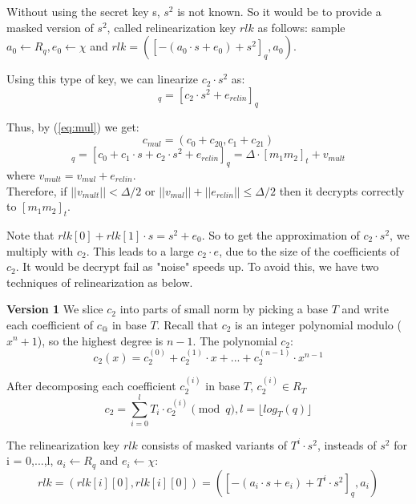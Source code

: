 \documentclass[A4paper,12pt]{article}
\begin{document}
Without using the secret key s, $s^2$ is not known. So it would be to provide a masked version of $s^2$, called relinearization key $rlk$ as follows: sample $a_0 \leftarrow R_q, e_0 \leftarrow \chi$ and $rlk = ([ -(a_0 \cdot s + e_0) + s^2]_q, a_0)$. \newline

Using this type of key, we can linearize $c_2 \cdot s^2$ as:
\begin{equation*}
	[c_{20} + c_{21} \cdot s]_q = [c_2 \cdot s^2 + e_{relin}]_q
\end{equation*}

Thus, by (\ref{eq:mul}) we get:
\begin{equation*}
	c_{mul} = (c_0 + c_{20}, c_1 + c_{21})
\end{equation*}
\begin{equation*}
	[c_0 + c_{20} + (c_1 + c_{21}) \cdot s]_q = [c_0 + c_1 \cdot s + c_2 \cdot s^2 + e_{relin}]_q = \Delta \cdot [m_1m_2]_t + v_{mult}
\end{equation*}
where $v_{mult} = v_{mul} + e_{relin}$. \\
 Therefore, if $||v_{mult}|| < \Delta / 2$ or $||v_{mul}|| + ||e_{relin}|| \leq \Delta / 2$ then it decrypts correctly to $[m_1m_2]_t$.

Note that $rlk[0] + rlk[1] \cdot s = s^2 + e_0$. So to get the approximation of $c_2 \cdot s^2$, we multiply with $c_2$. This leads to a large $c_2 \cdot e$, due to the size of the coefficients of $c_2$. It would be decrypt fail as "noise" speeds up. To avoid this, we have two techniques of relinearization as below.

\textbf{Version 1} We slice $c_2$ into parts of small norm by picking a base $T$ and write each coefficient of $c_@$ in base $T$. Recall that $c_2$ is an integer polynomial modulo ($x^n + 1$), so the highest degree is $n - 1$. The polynomial $c_2$:
\begin{equation*} 
	c_2(x) = c_2^{(0)} + c_2^{(1)} \cdot x + ... + c_2^{(n - 1)} \cdot x^{n - 1}
\end{equation*}

After decomposing each coefficient $c_2^{(i)}$ in base $T$, $c_2^{(i)} \in R_T$
\begin{equation*}
	c_2 = \sum_{i = 0}^{l}T_i \cdot c_2^{(i)} \pmod q,  l = \lfloor log_T(q) \rfloor
\end{equation*}

The relinearization key $rlk$ consists of masked variants of $T^i \cdot s^2$, insteads of $s^2$ for i = 0,...,l, $a_i \leftarrow R_q$ and $e_i \leftarrow \chi$:
\begin{equation*}
	rlk = (rlk[i][0], rlk[i][0]) = ([- (a_i \cdot s + e_i) + T^i \cdot s^2]_q, a_i)
\end{equation*}
\end{document}

